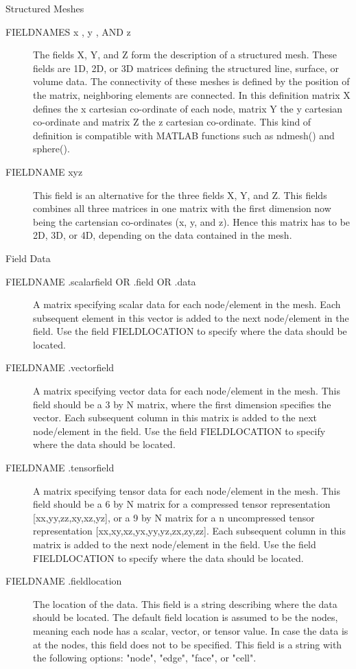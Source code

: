 Structured Meshes
\begin{description}

\item[ FIELDNAMES x , y , AND z]  
			The fields X, Y, and Z form the description of a structured mesh. These fields are 1D, 2D, or 3D matrices defining
			the structured line, surface, or volume data. The connectivity of these meshes is defined by the position of the 
			matrix, neighboring elements are connected. In this definition matrix X defines the x cartesian co-ordinate of each node,
			matrix Y the y cartesian co-ordinate and matrix Z the z cartesian co-ordinate. This kind of definition is compatible
			with MATLAB functions such as ndmesh() and sphere(). 
			
\item[ FIELDNAME xyz ] 
			This field is an alternative for the three fields X, Y, and Z. This fields combines all three matrices in one matrix with
			the first dimension now being the cartensian co-ordinates (x, y, and z). Hence this matrix has to be 2D, 3D, or 4D, depending
			on the data contained in the mesh.
			
\end{description}
Field Data
\begin{description}

\item[ FIELDNAME .scalarfield OR .field OR .data ] 
			A matrix specifying scalar data for each node/element in the mesh. Each subsequent element in this vector is added to the
			next node/element in the field. Use the field FIELDLOCATION to specify where the data should be located. 
			
\item[ FIELDNAME .vectorfield ] 
			A matrix specifying vector data for each node/element in the mesh. This field should be a 3 by N matrix, where the first 
			dimension specifies the vector. Each subsequent column in this matrix is added to the
			next node/element in the field. Use the field FIELDLOCATION to specify where the data should be located. 
			
\item[ FIELDNAME .tensorfield ] 
			A matrix specifying tensor data for each node/element in the mesh. This field should be a 6 by N matrix for a compressed
			tensor representation [xx,yy,zz,xy,xz,yz], or a 9 by N matrix for a n uncompressed tensor representation
			[xx,xy,xz,yx,yy,yz,zx,zy,zz]. Each subsequent column in this matrix is added to the
			next node/element in the field. Use the field FIELDLOCATION to specify where the data should be located. 
			
\item[ FIELDNAME .fieldlocation ] 
			The location of the data. This field is a string describing where the data should be located.
			The default field location is assumed to be the nodes, meaning each node has a scalar, vector, or tensor value. 
			In case the data is at the nodes, this field does not to be specified.
			This field is a string with the following options: "node", "edge", "face", or "cell".
			
\end{description}


